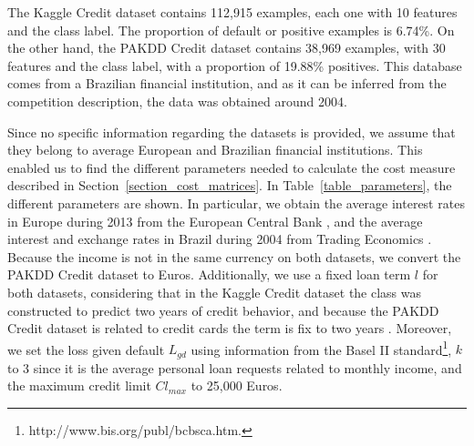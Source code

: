     The Kaggle Credit dataset contains 112,915 examples, each one with 10 features and the class 
    label. The proportion of default or positive examples is 6.74\%. 
    On the other hand, the PAKDD Credit dataset contains 38,969 examples, with 30 features and the 
    class label, with a proportion of 19.88\% positives. This database comes from a Brazilian 
    financial institution, and as it can be inferred from the competition description, the data 
    was obtained around 2004.
    
    Since no specific information regarding the datasets is provided, we assume that they belong to 
    average European and Brazilian financial institutions. This enabled us to find the different 
    parameters needed to calculate the cost measure described in 
    Section~\ref{section_cost_matrices}. In Table~\ref{table_parameters}, the different 
    parameters are shown. In particular, we obtain the average interest rates in Europe during 
    2013 from the European Central Bank \citep{ECB2014}, and the average interest and exchange 
    rates in Brazil during 2004 from Trading Economics \citep{Economics2014}. Because the income 
    is not in the same currency on both datasets, we convert the PAKDD Credit dataset to Euros.
    Additionally, we use a fixed loan term $l$ for both datasets, considering that in the Kaggle 
    Credit dataset the class was constructed to predict two years of credit behavior, and 
    because the PAKDD Credit dataset is related to credit cards the term is fix to two years 
    \citep{Lawrence2012}. Moreover, we set the loss given default $L_{gd}$ using information from 
    the Basel II standard\footnote{http://www.bis.org/publ/bcbsca.htm.}, $k$ to 3 since it is the 
    average personal loan requests related to monthly income, and the maximum credit limit 
    $Cl_{max}$ to 25,000 Euros.